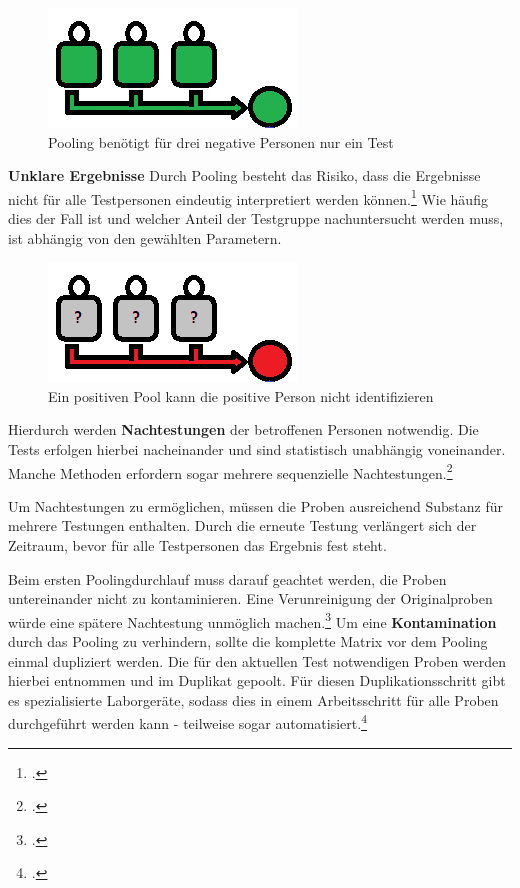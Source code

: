 \begin{figure}[h]
	\centering
	\includegraphics[width=.35\textwidth]{img/PoolAlleNegativ}
	\caption{Pooling benötigt für drei negative Personen nur ein Test\footnotemark}
\end{figure}




\textbf{Unklare Ergebnisse}\newline
Durch Pooling besteht das Risiko, dass die Ergebnisse nicht für alle Testpersonen eindeutig interpretiert werden können.\footcite{viehweger_increased_2020}
Wie häufig dies der Fall ist und welcher Anteil der Testgruppe nachuntersucht werden muss, ist abhängig von den gewählten Parametern.

\begin{figure}[h]
	\centering
	\includegraphics[width=.35\textwidth]{img/PoolPositiv}
	\caption{Ein positiven Pool kann die positive Person nicht identifizieren\footnotemark}
\end{figure}
\cleardoublepage
Hierdurch werden \textbf{Nachtestungen} der betroffenen Personen notwendig.
Die Tests erfolgen hierbei nacheinander und sind statistisch unabhängig voneinander.
Manche Methoden erfordern sogar mehrere sequenzielle Nachtestungen.\footcite{verwilt_evaluation_2021}

Um Nachtestungen zu ermöglichen, müssen die Proben ausreichend Substanz für mehrere Testungen enthalten.
Durch die erneute Testung verlängert sich der Zeitraum, bevor für alle Testpersonen das Ergebnis fest steht.

Beim ersten Poolingdurchlauf muss darauf geachtet werden, die Proben untereinander nicht zu kontaminieren.
Eine Verunreinigung der Originalproben würde eine spätere Nachtestung unmöglich machen.\footcite{verwilt_evaluation_2021}
Um eine \textbf{Kontamination} durch das Pooling zu verhindern, sollte die komplette Matrix vor dem Pooling einmal dupliziert werden. 
Die für den aktuellen Test notwendigen Proben werden hierbei entnommen und im Duplikat gepoolt.
Für diesen Duplikationsschritt gibt es spezialisierte Laborgeräte, sodass dies in einem Arbeitsschritt für alle Proben durchgeführt werden kann - teilweise sogar automatisiert.\footcite{kendall_antigen-based_2021}



